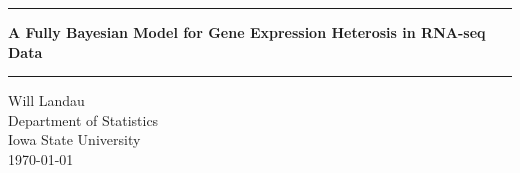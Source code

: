 \documentclass{article}\usepackage{graphicx, color}
\begin{document}
\begin{titlepage}
\begin{center}

\vspace*{4cm}
\hrule 
\vspace{0.4cm}
{ \huge \bfseries A Fully Bayesian Model for Gene Expression Heterosis in RNA-seq Data}
\vspace{0.4cm}
\hrule 

\vspace{1cm}
\Large
\begin{center}
Will Landau \\ $\quad$ \\
Department of Statistics \\
Iowa State University \\ $\quad$ \\
\today
\end{center}

\vfill
\large
\end{center}
\end{titlepage}

\newpage 
\pagestyle{fancy}
\setcounter{page}{1}
\tableofcontents 

\newpage
\setcounter{page}{1}
\end{document}
